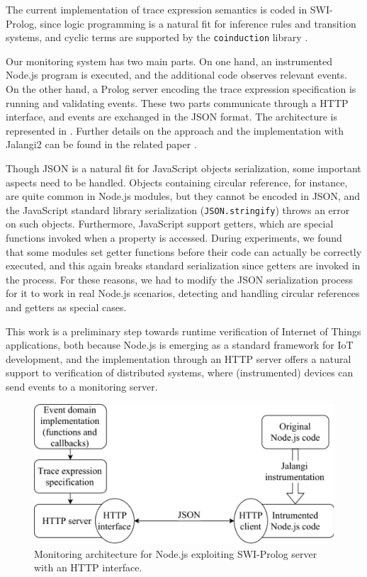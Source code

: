 The current implementation of trace expression semantics is coded in SWI-Prolog, since logic programming is a natural fit for inference rules and transition systems, and cyclic terms are supported by the \texttt{coinduction} library \cite{CoLP06}.

Our monitoring system has two main parts.
On one hand, an instrumented Node.js program is executed, and the additional code observes relevant events.
On the other hand, a Prolog server encoding the trace expression specification is running and validating events.
These two parts communicate through a HTTP interface, and events are exchanged in the JSON format.
The architecture is represented in .
Further details on the approach and the implementation with Jalangi2 can be found in the related paper \cite{TowardsIoT17}.

Though JSON is a natural fit for JavaScript objects serialization, some important aspects need to be handled.
Objects containing circular reference, for instance, are quite common in Node.js modules, but they cannot be encoded in JSON, and the JavaScript standard library serialization (\lstinline|JSON.stringify|) throws an error on such objects.
Furthermore, JavaScript support getters, which are special functions invoked when a property is accessed.
During experiments, we found that some modules set getter functions before their code can actually be correctly executed, and this again breaks standard serialization since getters are invoked in the process.
For these reasons, we had to modify the JSON serialization process for it to work in real Node.js scenarios, detecting and handling circular references and getters as special cases.

This work is a preliminary step towards runtime verification of Internet of Things applications,
both because Node.js is emerging as a standard framework for IoT development, and the implementation through an HTTP
server offers a natural support to verification of distributed systems, where (instrumented) devices can send events to a monitoring server.

\begin{figure}
\centering\includegraphics[width=.7\textwidth]{fig/diagram}
\caption{Monitoring architecture for Node.js exploiting SWI-Prolog server with an HTTP interface.}
\label{fig:arch}
\end{figure}

